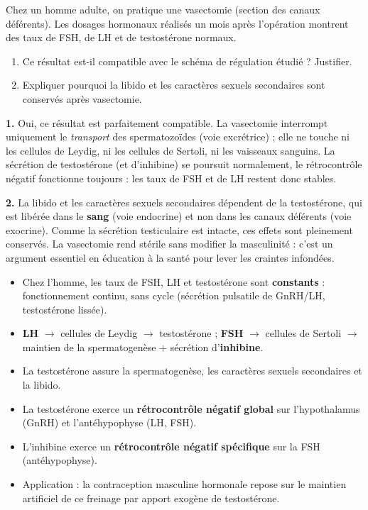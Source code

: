 \documentclass[11pt]{article}
\begin{document}
\begin{exercice}
Chez un homme adulte, on pratique une vasectomie (section des canaux déférents). Les dosages hormonaux réalisés un mois après l'opération montrent des taux de FSH, de LH et de testostérone normaux.
\begin{enumerate}
\item Ce résultat est-il compatible avec le schéma de régulation étudié ? Justifier.
\item Expliquer pourquoi la libido et les caractères sexuels secondaires sont conservés après vasectomie.
\end{enumerate}
\end{exercice}

\begin{corrige}
\textbf{1.} Oui, ce résultat est parfaitement compatible. La vasectomie interrompt uniquement le \emph{transport} des spermatozoïdes (voie excrétrice) ; elle ne touche ni les cellules de Leydig, ni les cellules de Sertoli, ni les vaisseaux sanguins. La sécrétion de testostérone (et d'inhibine) se poursuit normalement, le rétrocontrôle négatif fonctionne toujours : les taux de FSH et de LH restent donc stables.

\textbf{2.} La libido et les caractères sexuels secondaires dépendent de la testostérone, qui est libérée dans le \textbf{sang} (voie endocrine) et non dans les canaux déférents (voie exocrine). Comme la sécrétion testiculaire est intacte, ces effets sont pleinement conservés. La vasectomie rend stérile sans modifier la masculinité : c'est un argument essentiel en éducation à la santé pour lever les craintes infondées.
\end{corrige}

\begin{aretenir}
\begin{itemize}
\item Chez l'homme, les taux de FSH, LH et testostérone sont \textbf{constants} : fonctionnement continu, sans cycle (sécrétion pulsatile de GnRH/LH, testostérone lissée).
\item \textbf{LH} $\rightarrow$ cellules de Leydig $\rightarrow$ testostérone ; \textbf{FSH} $\rightarrow$ cellules de Sertoli $\rightarrow$ maintien de la spermatogenèse + sécrétion d'\textbf{inhibine}.
\item La testostérone assure la spermatogenèse, les caractères sexuels secondaires et la libido.
\item La testostérone exerce un \textbf{rétrocontrôle négatif global} sur l'hypothalamus (GnRH) et l'antéhypophyse (LH, FSH).
\item L'inhibine exerce un \textbf{rétrocontrôle négatif spécifique} sur la FSH (antéhypophyse).
\item Application : la contraception masculine hormonale repose sur le maintien artificiel de ce freinage par apport exogène de testostérone.
\end{itemize}
\end{aretenir}
\end{document}
